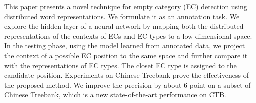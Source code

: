 This paper presents a novel technique for empty category (EC) detection using distributed word representations. We formulate it as an annotation task. We explore the hidden layer of a neural network by mapping both the distributed representations of the contexts of ECs and EC types to a low dimensional space. In the testing phase, using the model learned from annotated data, we project the context of a possible EC position to the same space and further compare it with the representations of EC types. The closet EC type is assigned to the candidate position. Experiments on Chinese Treebank prove the effectiveness of the proposed method. We improve the precision by about 6 point on a subset of Chinese Treebank, which is a new state-of-the-art performance on CTB.
